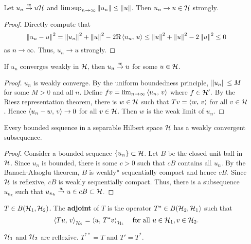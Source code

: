\begin{proposition}
    Let $u_n\overset{w}{\to} u\mathcal{H}$ and $\limsup_{n\to\infty}\left\lVert {u_n} \right\rVert\leq\left\lVert {u} \right\rVert$. Then 
    $u_n\to u\in\mathcal{H}$ strongly. 
\end{proposition}
\begin{proof}
    Directly compute that 
    \begin{equation*}
        \left\lVert {u_n-u} \right\rVert^2 = \left\lVert {u_n} \right\rVert^2 + \left\lVert {u} \right\rVert^2 - 2\Re\left\langle {u_n},\, {u} \right\rangle 
        \leq \left\lVert {u} \right\rVert^2 + \left\lVert {u} \right\rVert^2 - 2\left\lVert {u} \right\rVert^2 \leq 0
    \end{equation*}
    as $n\to\infty$. Thus, $u_n\to u$ strongly.
\end{proof}

\begin{proposition}
    If $u_n$ converges weakly in $\mathcal{H}$, then $u_n\overset{w}{\to} u$ for some $u\in\mathcal{H}$. 
\end{proposition}
\begin{proof}
    $u_n$ is weakly converge. By the uniform boundedness principle, 
    $\left\lVert {u_n} \right\rVert\leq M$ for some $M>0$ and all $n$. Define $fv = \lim_{n\to\infty}\left\langle {u_n},\, {v} \right\rangle$ 
    where $f\in\mathcal{H}'$. By the Riesz representation theorem, there is $w\in\mathcal{H}$ such that 
    $Tv = \left\langle {w},\, {v} \right\rangle$ for all $v\in\mathcal{H}$. Hence $\left\langle {u_n - w},\, {v} \right\rangle\to 0$ for all $v\in\mathcal{H}$. 
    Then $w$ is the weak limit of $u_n$.
\end{proof}

\begin{proposition}
    Every bounded sequence in a separable Hilbert space $\mathcal{H}$ has a weakly convergent subsequence.
\end{proposition}
\begin{proof}
    Consider a bounded sequence $\left\{ {u_n} \right\}\subset\mathcal{H}$. Let $B$ be the closed unit ball 
    in $\mathcal{H}$. Since $u_n$ is bounded, there is some $c>0$ such that $cB$ contains all 
    $u_n$. By the Banach-Alaoglu theorem, $B$ is weakly* sequentially compact and hence 
    $cB$. Since $\mathcal{H}$ is reflexive, $cB$ is weakly sequentially compact. Thus, there is a subsequence 
    $u_{n_k}$ such that $u_{n_k}\overset{w}{\to} u\in cB\subset\mathcal{H}$.
\end{proof}

\begin{definition}
    $T\in B(\mathcal{H}_1,\mathcal{H}_2)$. The \textbf{adjoint} of $T$ is the operator $T^*\in B(\mathcal{H}_2,\mathcal{H}_1)$ such that 
    \begin{equation*}
        \left\langle {Tu},\, {v} \right\rangle_{\mathcal{H}_2} = \left\langle {u},\, {T^*v} \right\rangle_{\mathcal{H}_1}\quad\text{for all }u\in\mathcal{H}_1, v\in\mathcal{H}_2.
    \end{equation*}
\end{definition}
\begin{remark}
    $\mathcal{H}_1$ and $\mathcal{H}_2$ are reflexive. $T^{**} = T$ and $T' = T^*$.
\end{remark}

